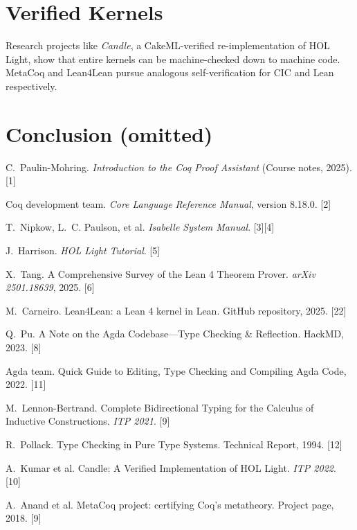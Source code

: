 \documentclass[11pt,a4paper]{article}
\begin{document}
\section{Verified Kernels}
Research projects like \emph{Candle}, a CakeML-verified re-implementation of HOL Light, show that entire kernels can be machine-checked down to machine code\cite{candle}.  MetaCoq and Lean4Lean pursue analogous self-verification for CIC and Lean respectively\cite{metacoq,bidirectional-cic,lean4lean}.  

\section{Conclusion (omitted)}

\begin{thebibliography}{10}

C.~Paulin-Mohring.
\newblock \emph{Introduction to the Coq Proof Assistant} (Course notes, 2025). [1]

Coq development team.
\newblock \emph{Core Language Reference Manual}, version 8.18.0. [2]

T.~Nipkow, L.~C. Paulson, et al.
\newblock \emph{Isabelle System Manual}. [3][4]

J.~Harrison.
\newblock \emph{HOL Light Tutorial}. [5]

X.~Tang.
\newblock A Comprehensive Survey of the Lean 4 Theorem Prover. \emph{arXiv 2501.18639}, 2025. [6]

M.~Carneiro.
\newblock Lean4Lean: a Lean 4 kernel in Lean. GitHub repository, 2025. [22]

Q.~Pu.
\newblock A Note on the Agda Codebase—Type Checking \& Reflection. HackMD, 2023. [8]

Agda team.
\newblock Quick Guide to Editing, Type Checking and Compiling Agda Code, 2022. [11]

M.~Lennon-Bertrand.
\newblock Complete Bidirectional Typing for the Calculus of Inductive Constructions. \emph{ITP 2021}. [9]

R.~Pollack.
\newblock Type Checking in Pure Type Systems. Technical Report, 1994. [12]

A.~Kumar et al.
\newblock Candle: A Verified Implementation of HOL Light. \emph{ITP 2022}. [10]

A.~Anand et al.
\newblock MetaCoq project: certifying Coq’s metatheory. Project page, 2018. [9]

\end{thebibliography}
\end{document}
